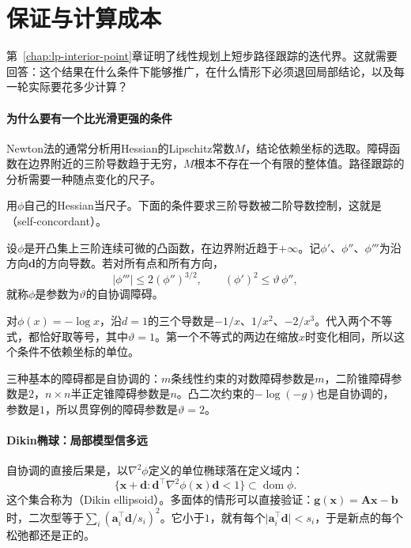 \section{保证与计算成本}
\label{sec:nlipm-guarantees}

第~\ref{chap:lp-interior-point}章证明了线性规划上短步路径跟踪的迭代界。这就需要回答：这个结果在什么条件下能够推广，在什么情形下必须退回局部结论，以及每一轮实际要花多少计算？

\paragraph{为什么要有一个比光滑更强的条件}
Newton法的通常分析用Hessian的Lipschitz常数$M$，结论依赖坐标的选取。障碍函数在边界附近的三阶导数趋于无穷，$M$根本不存在一个有限的整体值。路径跟踪的分析需要一种随点变化的尺子。

用$\phi$自己的Hessian当尺子。下面的条件要求三阶导数被二阶导数控制，这就是（self-concordant）。

\begin{definition}[自协调障碍]
\label{def:nlipm-self-concordant}
设$\phi$是开凸集上三阶连续可微的凸函数，在边界附近趋于$+\infty$。记$\phi'$、$\phi''$、$\phi'''$为沿方向$\bm{d}$的方向导数。若对所有点和所有方向，
\begin{equation}
 \lvert\phi'''\rvert\leq2(\phi'')^{3/2},\qquad(\phi')^2\leq\vartheta\,\phi'',
 \label{eq:nlipm-self-concordant}
\end{equation}
就称$\phi$是参数为$\vartheta$的自协调障碍。
\end{definition}

对$\phi(x)=-\log x$，沿$d=1$的三个导数是$-1/x$、$1/x^2$、$-2/x^3$。代入两个不等式，都恰好取等号，其中$\vartheta=1$。第一个不等式的两边在缩放$x$时变化相同，所以这个条件不依赖坐标的单位。

三种基本的障碍都是自协调的：$m$条线性约束的对数障碍参数是$m$，二阶锥障碍参数是$2$，$n\times n$半正定锥障碍参数是$n$。凸二次约束的$-\log(-g)$也是自协调的，参数是$1$，所以贯穿例的障碍参数是$\vartheta=2$。

\paragraph{Dikin椭球：局部模型信多远}
自协调的直接后果是，以$\nabla^2\phi$定义的单位椭球落在定义域内：
\begin{equation}
 \bigl\{\bm{x}+\bm{d}:\bm{d}^\top\nabla^2\phi(\bm{x})\bm{d}<1\bigr\}\subset\operatorname{dom}\phi.
 \label{eq:nlipm-dikin}
\end{equation}
这个集合称为（Dikin ellipsoid）。多面体的情形可以直接验证：$\bm{g}(\bm{x})=\bm{A}\bm{x}-\bm{b}$时，二次型等于$\sum_i(\bm{a}_i^\top\bm{d}/s_i)^2$。它小于$1$，就有每个$\lvert\bm{a}_i^\top\bm{d}\rvert<s_i$，于是新点的每个松弛都还是正的。

